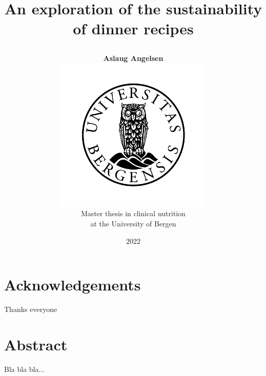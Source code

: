 
\pagestyle{plain}

\begin{titlepage}

\begin{center}

\title{{\fontsize{25}{24}\textbf{An exploration of the sustainability of dinner recipes}}
	\author{
	\large\textbf{Aslaug Angelsen}\vspace{4em}\\
		\includegraphics[width=74mm]{images/emblem}\vspace{4em}\\
		Master thesis in clinical nutrition\\ at the University of Bergen}
	\huge\date{2022}
}

\end{center}
\afterpage{\blankpage}
\end{titlepage}


\section*{Acknowledgements}
Thanks everyone
\pagebreak

\section*{Abstract}
Bla bla bla...
\pagebreak